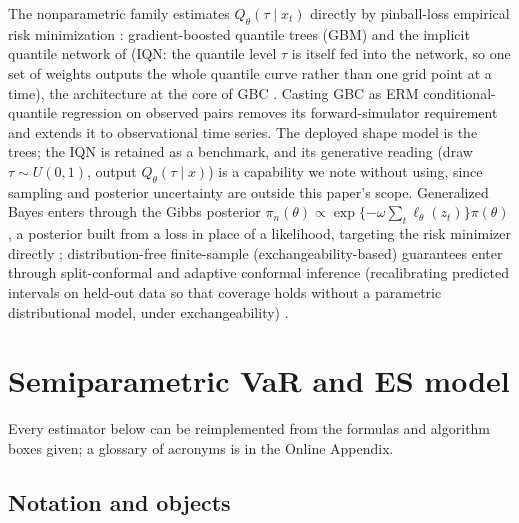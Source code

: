 \documentclass[11pt]{article}
\theoremstyle{remark}
\begin{document}
The nonparametric family estimates $Q_\theta(\tau \mid x_t)$ directly by
pinball-loss empirical risk minimization \citep{koenker1978}:
gradient-boosted quantile
trees (GBM) and the implicit quantile network of \citet{dabney2018iqn}
(IQN: the quantile level $\tau$ is itself fed into the network, so one
set of weights outputs the whole quantile curve rather than one grid
point at a time),
the architecture at the core of GBC \citep{polson2023gbc,
nareklishvili2025gqbp}. Casting GBC as ERM conditional-quantile
regression on observed pairs removes its forward-simulator requirement
and extends it to observational time series. The deployed shape model
is the trees; the IQN is retained as a benchmark, and its generative reading (draw $\tau \sim
U(0,1)$, output $Q_\theta(\tau \mid x)$) is a capability we note
without using, since sampling and posterior uncertainty are outside
this paper's scope. Generalized Bayes enters through the Gibbs
posterior $\pi_n(\theta) \propto
\exp\{-\omega \sum_t \ell_\theta(z_t)\}\pi(\theta)$, a posterior
built from a loss in place of a likelihood, targeting the risk
minimizer directly
\citep{jiang2008gibbs, bissiri2016general}; distribution-free
finite-sample (exchangeability-based) guarantees enter through split-conformal and adaptive
conformal inference (recalibrating predicted intervals on held-out
data so that coverage holds without a parametric distributional
model, under exchangeability)
\citep{gibbs2021aci}.

\section{Semiparametric VaR and ES model}\label{sec:methods}

Every estimator below can be reimplemented from the formulas and
algorithm boxes given; a glossary of acronyms is in the Online
Appendix.

\subsection{Notation and objects}\label{sec:notation}
\end{document}

